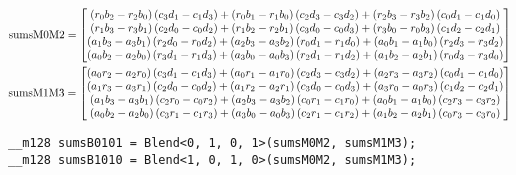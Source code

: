 \begin{align*}
\mathrm{sumsM0M2} 
=
\begin{bmatrix}
  \left(r_0b_2 - r_2b_0\right)\left(c_3d_1 - c_1d_3\right)
+ \left(r_0b_1 - r_1b_0\right)\left(c_2d_3 - c_3d_2\right)
+ \left(r_2b_3 - r_3b_2\right)\left(c_0d_1 - c_1d_0\right)\\
  \left(r_1b_3 - r_3b_1\right)\left(c_2d_0 - c_0d_2\right)
+ \left(r_1b_2 - r_2b_1\right)\left(c_3d_0 - c_0d_3\right)
+ \left(r_3b_0 - r_0b_3\right)\left(c_1d_2 - c_2d_1\right)\\
  \left(a_1b_3 - a_3b_1\right)\left(r_2d_0 - r_0d_2\right)
+ \left(a_2b_3 - a_3b_2\right)\left(r_0d_1 - r_1d_0\right)
+ \left(a_0b_1 - a_1b_0\right)\left(r_2d_3 - r_3d_2\right)\\
  \left(a_0b_2 - a_2b_0\right)\left(r_3d_1 - r_1d_3\right)
+ \left(a_3b_0 - a_0b_3\right)\left(r_2d_1 - r_1d_2\right)
+ \left(a_1b_2 - a_2b_1\right)\left(r_0d_3 - r_3d_0\right)\\
\end{bmatrix}
\\
\mathrm{sumsM1M3} 
=
\begin{bmatrix}
  \left(a_0r_2 - a_2r_0\right)\left(c_3d_1 - c_1d_3\right)
+ \left(a_0r_1 - a_1r_0\right)\left(c_2d_3 - c_3d_2\right)
+ \left(a_2r_3 - a_3r_2\right)\left(c_0d_1 - c_1d_0\right)\\
  \left(a_1r_3 - a_3r_1\right)\left(c_2d_0 - c_0d_2\right)
+ \left(a_1r_2 - a_2r_1\right)\left(c_3d_0 - c_0d_3\right)
+ \left(a_3r_0 - a_0r_3\right)\left(c_1d_2 - c_2d_1\right)\\
  \left(a_1b_3 - a_3b_1\right)\left(c_2r_0 - c_0r_2\right)
+ \left(a_2b_3 - a_3b_2\right)\left(c_0r_1 - c_1r_0\right)
+ \left(a_0b_1 - a_1b_0\right)\left(c_2r_3 - c_3r_2\right)\\
  \left(a_0b_2 - a_2b_0\right)\left(c_3r_1 - c_1r_3\right)
+ \left(a_3b_0 - a_0b_3\right)\left(c_2r_1 - c_1r_2\right)
+ \left(a_1b_2 - a_2b_1\right)\left(c_0r_3 - c_3r_0\right)\\
\end{bmatrix}
\end{align*}

\begin{verbatim}
__m128 sumsB0101 = Blend<0, 1, 0, 1>(sumsM0M2, sumsM1M3);
__m128 sumsB1010 = Blend<1, 0, 1, 0>(sumsM0M2, sumsM1M3);
\end{verbatim}

